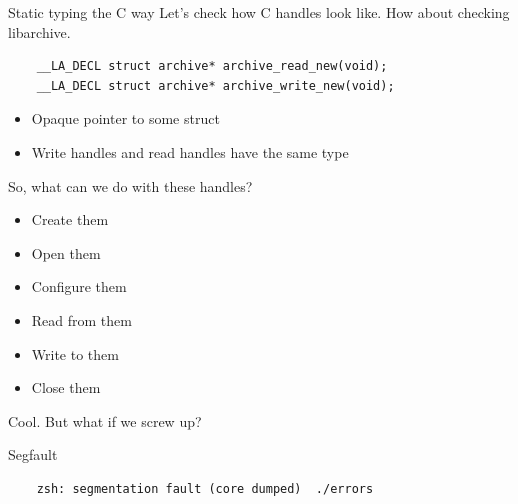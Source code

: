 \documentclass{beamer}
\begin{document}
\begin{frame}[fragile]{Static typing the C way}
  Let's check how C handles look like. How about checking libarchive.
  \begin{verbatim}
    __LA_DECL struct archive* archive_read_new(void);
    __LA_DECL struct archive* archive_write_new(void);
  \end{verbatim}
  \begin{itemize}
    \item Opaque pointer to some struct
    \item Write handles and read handles have the same type
  \end{itemize}
\end{frame}

\begin{frame}
  So, what can we do with these handles?
  \pause
  \begin{itemize}
    \item Create them
    \item Open them
    \item Configure them
    \item Read from them
    \item Write to them
    \item Close them
  \end{itemize}
  \pause
  Cool.
  \pause
  \alert{But what if we screw up?}
\end{frame}

\begin{frame}[fragile]{Segfault}
  \begin{verbatim}
    zsh: segmentation fault (core dumped)  ./errors
  \end{verbatim}
\end{frame}
\end{document}
